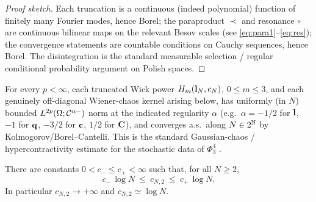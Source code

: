 \begin{proof}[Proof sketch]
Each truncation is a continuous (indeed polynomial) function of finitely many Fourier
modes, hence Borel; the paraproduct $\prec$ and resonance $\circ$ are continuous
bilinear maps on the relevant Besov scales (see \eqref{eq:para1}--\eqref{eq:res}); the
convergence statements are countable conditions on Cauchy sequences, hence Borel.
The disintegration is the standard measurable selection / regular conditional
probability argument on Polish spaces.
\end{proof}

\begin{qonelemma}\label{lem:cube}
For every $p<\infty$, each truncated Wick power $H_m(\mathbf{l}_N,c_N)$, $0\le m\le 3$,
and each genuinely off-diagonal Wiener-chaos kernel arising below, has uniformly (in
$N$) bounded $L^{2p}(\Omega; \mathcal{C}^{\alpha-})$ norm at the indicated regularity
$\alpha$ (e.g.\ $\alpha=-1/2$ for $\mathbf{l}$, $-1$ for $\mathbf{q}$, $-3/2$ for $\mathbf{c}$,
$1/2$ for $\mathbf{C}$), and converges a.s.\ along $N\in 2^{\mathbb{N}}$ by
Kolmogorov/Borel--Cantelli. This is the standard Gaussian-chaos / hypercontractivity
estimate for the stochastic data of $\Phi^4_3$ \cite{CC18,MW17b}.
\end{qonelemma}

\begin{qonelemma}\label{lem:logdiv}
There are constants $0<c_-\le c_+<\infty$ such that, for all $N\ge2$,
\[
c_-\,\log N\ \le\ c_{N,2}\ \le\ c_+\,\log N .
\]
In particular $c_{N,2}\to+\infty$ and $c_{N,2}\simeq\log N$.
\end{qonelemma}

